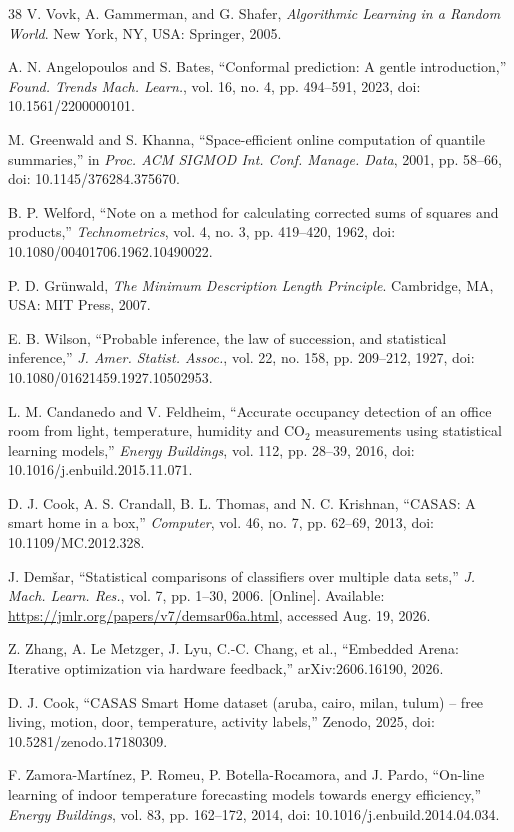 \documentclass[review]{elsarticle}
\begin{document}
\begin{thebibliography}{38}
 V. Vovk, A. Gammerman, and G. Shafer, \emph{Algorithmic Learning
in a Random World}. New York, NY, USA: Springer, 2005.

 A. N. Angelopoulos and S. Bates, ``Conformal prediction: A
gentle introduction,'' \emph{Found. Trends Mach. Learn.}, vol. 16, no. 4, pp.
494--591, 2023, doi: 10.1561/2200000101.

 M. Greenwald and S. Khanna, ``Space-efficient online computation
of quantile summaries,'' in \emph{Proc. ACM SIGMOD Int. Conf. Manage. Data},
2001, pp. 58--66, doi: 10.1145/376284.375670.

 B. P. Welford, ``Note on a method for calculating corrected sums
of squares and products,'' \emph{Technometrics}, vol. 4, no. 3, pp. 419--420,
1962, doi: 10.1080/00401706.1962.10490022.

 P. D. Gr\"unwald, \emph{The Minimum Description Length Principle}.
Cambridge, MA, USA: MIT Press, 2007.

 E. B. Wilson, ``Probable inference, the law of succession, and
statistical inference,'' \emph{J. Amer. Statist. Assoc.}, vol. 22, no. 158,
pp. 209--212, 1927, doi: 10.1080/01621459.1927.10502953.

 L. M. Candanedo and V. Feldheim, ``Accurate occupancy detection
of an office room from light, temperature, humidity and CO$_2$ measurements
using statistical learning models,'' \emph{Energy Buildings}, vol. 112, pp.
28--39, 2016, doi: 10.1016/j.enbuild.2015.11.071.

 D. J. Cook, A. S. Crandall, B. L. Thomas, and N. C. Krishnan,
``CASAS: A smart home in a box,'' \emph{Computer}, vol. 46, no. 7, pp.
62--69, 2013, doi: 10.1109/MC.2012.328.

 J. Dem\v{s}ar, ``Statistical comparisons of classifiers over
multiple data sets,'' \emph{J. Mach. Learn. Res.}, vol. 7, pp. 1--30, 2006.
[Online]. Available: \url{https://jmlr.org/papers/v7/demsar06a.html}, accessed
Aug. 19, 2026.

 Z. Zhang, A. Le Metzger, J. Lyu, C.-C. Chang, et al., ``Embedded
Arena: Iterative optimization via hardware feedback,'' arXiv:2606.16190,
2026.

 D. J. Cook, ``CASAS Smart Home dataset (aruba, cairo, milan,
tulum) -- free living, motion, door, temperature, activity labels,'' Zenodo,
2025, doi: 10.5281/zenodo.17180309.

 F. Zamora-Mart\'inez, P. Romeu, P. Botella-Rocamora, and J.
Pardo, ``On-line learning of indoor temperature forecasting models towards
energy efficiency,'' \emph{Energy Buildings}, vol. 83, pp. 162--172, 2014,
doi: 10.1016/j.enbuild.2014.04.034.


\end{thebibliography}
\end{document}
